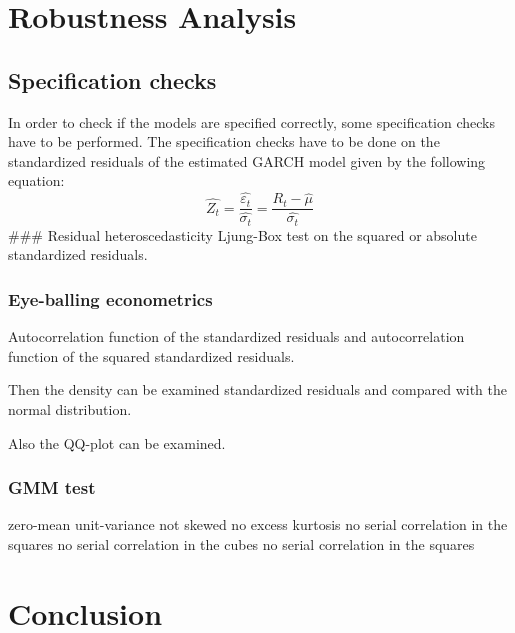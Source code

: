 \documentclass[a4paper, twoside]{templates/ociamthesis}
\begin{document}
\hypertarget{robustness-analysis}{%
\chapter{Robustness Analysis}\label{robustness-analysis}}

\minitoc 

\hypertarget{specification-checks}{%
\section{Specification checks}\label{specification-checks}}

In order to check if the models are specified correctly, some specification checks have to be performed. The specification checks have to be done on the standardized residuals of the estimated GARCH model given by the following equation:
\[ 
\hat{Z_t} = \dfrac{\hat{\varepsilon_t}}{\hat{\sigma_t}} = \dfrac{R_t - \hat{\mu}}{\hat{\sigma_t}}
\]
\#\#\# Residual heteroscedasticity
Ljung-Box test on the squared or absolute standardized residuals.

\hypertarget{eye-balling-econometrics}{%
\subsection{Eye-balling econometrics}\label{eye-balling-econometrics}}

Autocorrelation function of the standardized residuals and autocorrelation function of the squared standardized residuals.

Then the density can be examined standardized residuals and compared with the normal distribution.

Also the QQ-plot can be examined.

\hypertarget{gmm-test}{%
\subsection{GMM test}\label{gmm-test}}

zero-mean
unit-variance
not skewed
no excess kurtosis
no serial correlation in the squares
no serial correlation in the cubes
no serial correlation in the squares

\hypertarget{conclusion}{%
\chapter*{Conclusion}\label{conclusion}}
\end{document}
